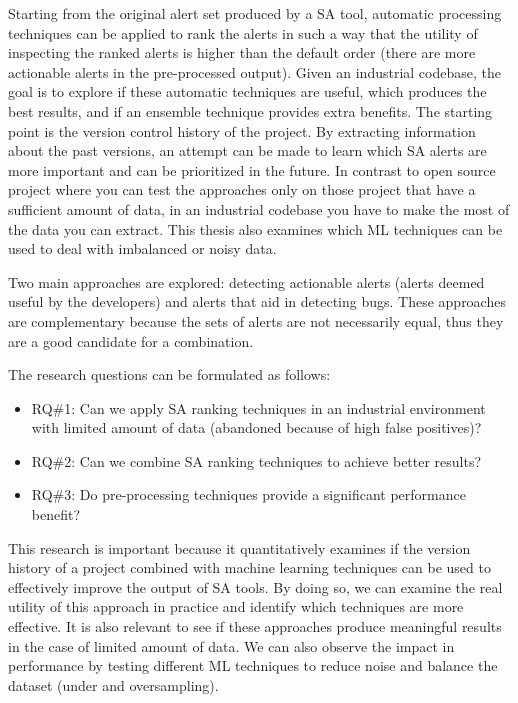 Starting from the original alert set produced by a SA tool, automatic processing techniques can be applied to rank the alerts in such a way that the utility of inspecting the ranked alerts is higher than the default order (there are more actionable alerts in the pre-processed output). Given an industrial codebase, the goal is to explore if these automatic techniques are useful, which produces the best results, and if an ensemble technique provides extra benefits. The starting point is the version control history of the project. By extracting information about the past versions, an attempt can be made to learn which SA alerts are more important and can be prioritized in the future. In contrast to open source project where you can test the approaches only on those project that have a sufficient amount of data, in an industrial codebase you have to make the most of the data you can extract. This thesis also examines which ML techniques can be used to deal with imbalanced or noisy data.


Two main approaches are explored: detecting actionable alerts (alerts deemed useful by the developers) and alerts that aid in detecting bugs. These approaches are complementary because the sets of alerts are not necessarily equal, thus they are a good candidate for a combination.

The research questions can be formulated as follows:
\begin{itemize}
    \item RQ\#1: Can we apply SA ranking techniques in an industrial environment with limited amount of data (abandoned because of high false positives)?
    \item RQ\#2: Can we combine SA ranking techniques to achieve better results?
    \item RQ\#3: Do pre-processing techniques provide a significant performance benefit?
\end{itemize}

This research is important because it quantitatively examines if the version history of a project combined with machine learning techniques can be used to effectively improve the output of SA tools. By doing so, we can examine the real utility of this approach in practice and identify which techniques are more effective. It is also relevant to see if these approaches produce meaningful results in the case of limited amount of data. We can also observe the impact in performance by testing different ML techniques to reduce noise and balance the dataset (under and oversampling). 

